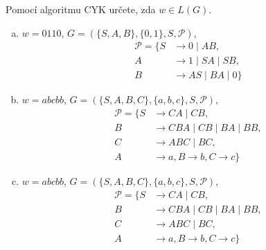 \documentclass[a4paper,12pt]{amsart}
\begin{document}
\medskip\begin{problem}
    
    Pomocí algoritmu CYK určete, zda $w\in L(G)$.

    \bigskip

    \begin{enumerate}[(a)]\setlength{\itemsep}{3pt}

        \item $w=0110$, $G=(\{S,A,B\},\{0, 1\},S,\mathcal P)$,        
        \begin{align*}
            \mathcal P=\{S&\rightarrow 0\mid AB, \\
            A&\rightarrow 1\mid SA\mid SB, \\
            B&\rightarrow AS \mid BA \mid 0\}
        \end{align*}
    
        \item $w=abcbb$, $G=(\{S,A,B,C\},\{a,b,c\},S,\mathcal P)$, 
        \begin{align*}
            \mathcal P=\{S&\rightarrow CA\mid CB, \\
            B&\rightarrow CBA\mid CB\mid BA\mid BB, \\
            C&\rightarrow ABC\mid BC,\\
            A&\rightarrow a, B\rightarrow b, C\rightarrow c\}
        \end{align*}
    
        \item $w=abcbb$, $G=(\{S,A,B,C\},\{a,b,c\},S,\mathcal P)$,
        \begin{align*}
            \mathcal P=\{S&\rightarrow CA\mid CB, \\
            B&\rightarrow CBA\mid CB\mid BA\mid BB, \\
            C&\rightarrow ABC\mid BC,\\
            A&\rightarrow a, B\rightarrow b, C\rightarrow c\}
        \end{align*}

    \end{enumerate}

\end{problem}
    
\end{document}
